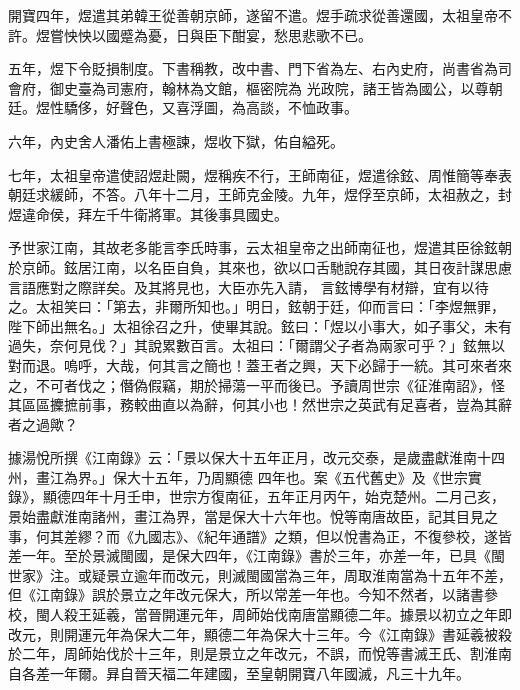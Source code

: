 \begin{pinyinscope}
 開寶四年，煜遣其弟韓王從善朝京師，遂留不遣。煜手疏求從善還國，太祖皇帝不許。煜嘗怏怏以國蹙為憂，日與臣下酣宴，愁思悲歌不已。



 五年，煜下令貶損制度。下書稱教，改中書、門下省為左、右內史府，尚書省為司會府，御史臺為司憲府，翰林為文館，樞密院為
 光政院，諸王皆為國公，以尊朝廷。煜性驕侈，好聲色，又喜浮圖，為高談，不恤政事。



 六年，內史舍人潘佑上書極諫，煜收下獄，佑自縊死。



 七年，太祖皇帝遣使詔煜赴闕，煜稱疾不行，王師南征，煜遣徐鉉、周惟簡等奉表朝廷求緩師，不答。八年十二月，王師克金陵。九年，煜俘至京師，太祖赦之，封煜違命侯，拜左千牛衛將軍。其後事具國史。



 予世家江南，其故老多能言李氏時事，云太祖皇帝之出師南征也，煜遣其臣徐鉉朝於京師。鉉居江南，以名臣自負，其來也，欲以口舌馳說存其國，其日夜計謀思慮言語應對之際詳矣。及其將見也，大臣亦先入請，
 言鉉博學有材辯，宜有以待之。太祖笑曰：「第去，非爾所知也。」明日，鉉朝于廷，仰而言曰：「李煜無罪，陛下師出無名。」太祖徐召之升，使畢其說。鉉曰：「煜以小事大，如子事父，未有過失，奈何見伐？」其說累數百言。太祖曰：「爾謂父子者為兩家可乎？」鉉無以對而退。嗚呼，大哉，何其言之簡也！蓋王者之興，天下必歸于一統。其可來者來之，不可者伐之；僭偽假竊，期於掃蕩一平而後已。予讀周世宗《征淮南詔》，怪其區區攈摭前事，務較曲直以為辭，何其小也！然世宗之英武有足喜者，豈為其辭者之過歟？



 據湯悅所撰《江南錄》云：「景以保大十五年正月，改元交泰，是歲盡獻淮南十四州，畫江為界。」保大十五年，乃周顯德
 四年也。案《五代舊史》及《世宗實錄》，顯德四年十月壬申，世宗方復南征，五年正月丙午，始克楚州。二月己亥，景始盡獻淮南諸州，畫江為界，當是保大十六年也。悅等南唐故臣，記其目見之事，何其差繆？而《九國志》、《紀年通譜》之類，但以悅書為正，不復參校，遂皆差一年。至於景滅閩國，是保大四年，《江南錄》書於三年，亦差一年，已具《閩世家》注。或疑景立逾年而改元，則滅閩國當為三年，周取淮南當為十五年不差，但《江南錄》誤於景立之年改元保大，所以常差一年也。今知不然者，以諸書參校，閩人殺王延羲，當晉開運元年，周師始伐南唐當顯德二年。據景以初立之年即改元，則開運元年為保大二年，顯德二年為保大十三年。今《江南錄》書延羲被殺於二年，周師始伐於十三年，則是景立之年改元，不誤，而悅等書滅王氏、割淮南自各差一年爾。昪自晉天福二年建國，至皇朝開寶八年國滅，凡三十九年。



\end{pinyinscope}